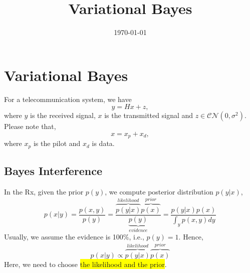 \documentclass{article}
\title{
	\Huge \textbf{Variational Bayes} \\[1em]
}
\author{\qxw}
\date{\today}
\begin{document}

\maketitle

\newpage
\tableofcontents
\newpage

\section{Variational Bayes}
For a telecommunication system, we have
\begin{equation}
y = Hx + z,
\end{equation}
where $y$ is the received signal, $x$ is the transmitted signal and $z\in \mathcal{CN}(0, \sigma^2)$. Please note that, 
\begin{equation}
x = x_p + x_d,
\end{equation}
where $x_p$ is the pilot and $x_d$ is data.
\subsection{Bayes Interference}
In the Rx, given the prior $p(y)$, we compute posterior distribution $p(y|x)$,
\begin{equation}
p(x|y) = \frac{p(x,y)}{p(y)} = \frac{\overbrace{p(y|x)}^{likelihood}\overbrace{p(x)}^{prior}}{\underbrace{p(y)}_{evidence}} = \frac{p(y|x)p(x)}{\int_y p(x,y)dy}
\end{equation}
Usually, we assume the evidence is 100\%, i.e., $p(y)=1$. Hence,
\begin{equation}
p(x|y) \propto \overbrace{p(y|x)}^{likelihood}\overbrace{p(x)}^{prior}
\end{equation}
Here, we need to choose \colorbox{yellow}{the likelihood and the prior}.
\end{document}
